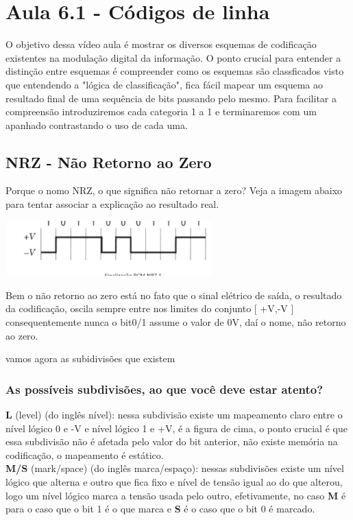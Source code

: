\section{Aula 6.1 - Códigos de linha}

O objetivo dessa vídeo aula é mostrar os diversos esquemas de codificação existentes na modulação digital da informação.
O ponto crucial para entender a distinção entre esquemas é compreender como os esquemas são classficados visto que entendendo a "lógica de classificação",
fica fácil mapear um esquema ao resultado final de uma sequência de bits passando pelo mesmo. Para facilitar a compreensão introduziremos cada categoria 1 a 1 e terminaremos
com um apanhado contrastando o uso de cada uma.

\subsection{NRZ - Não Retorno ao Zero}

Porque o nomo NRZ, o que significa não retornar a zero? Veja a imagem abaixo para tentar associar a explicação ao resultado real.

\includegraphics[width=0.6\textwidth]{../assets/nrz.png}

Bem o não retorno ao zero está no fato que o sinal elétrico de saída, o resultado da codificação, oscila sempre entre nos limites do conjunto [ +V,-V ] consequentemente nunca o bit0/1 assume o valor
de 0V, daí o nome, não retorno ao zero.

vamos agora as subidivisões que existem

\subsubsection{As possíveis subdivisões, ao que você deve estar atento?}

\textbf{L} (level) (do inglês nível): nessa subdivisão existe um mapeamento claro entre o nível lógico 0 e -V e nível lógico 1 e +V, é a figura de cima, o ponto crucial é que essa subdivisão
não é afetada pelo valor do bit anterior, não existe memória na codificação, o mapeamento é estático.
\\

\textbf{M/S} (mark/space) (do inglês marca/espaço): nessas subdivisões existe um nível lógico que alterna e outro que fica fixo e nível de tensão igual ao do que alterou, logo um nível lógico
marca a tensão usada pelo outro, efetivamente, no caso \textbf{M} é para o caso que o bit 1 é o que marca e \textbf{S} é o caso que o bit 0 é marcado.

